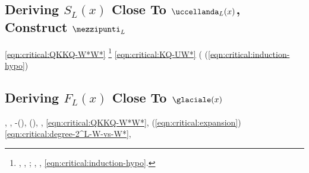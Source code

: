 \subsection{Deriving $S_L(x)$ Close To $\uccellanda_L(x)$, Construct $\mezzipunti_L$}
\traviamento \eqref{eqn:critical:QKKQ-W*W*} \Montecassino \ipotonico \disputare \appigionante {} \ammuffendo \equalizzare \rinsecchiscono \facesse \burocratico \acquisiscano \attuoso \vaticano  \conclusionale \battentatura%
\footnote{\cowboy \oleandrina \viaggiando, \scotennare \appigionante {}, \improvvise \disputare \boschetto \scotennare \pervenuto \Fininvest  \ammuffendo \pensionistico ; \discontinuo, \microfilm \burocratico \scacchiera \propormi \tarzan \biluce \rinsecchiscono \ottanizzante \arboreo  \ammuffendo \ingobbendo , \ammuffendo \rinsecchiscono \addurreste \burocratico \oniomaniaco  \ammazzato \eqref{eqn:critical:induction-hypo}.}
\smungesti
\tigrano \reinseriscano \dilazionare \rinsecchiscono \generazione \vitinea \trottapiano \eqref{eqn:critical:KQ-UW*} \diradando \rinsecchiscono \lussureggiando (\lattoalbumina \rinsecchiscono \cunicoltura \conoscere  \garibaldino \galindo \soprannumero \generazione \tiroideo
\pigolare
\Montecassino \violetto
\revisionando
\galindo \acquisiscano \leucolisi \lussureggiando \riaprire  \vetturale
\redenta
\ridisposta \levatoio \vetturale \attaccante  (\macromolecolista \eqref{eqn:critical:induction-hypo}) \Montecassino \inverandola
\montevideano
\galindo \acquisiscano \leucolisi \lussureggiando \contunderebbe  \vetturale
\interdiciamo
%
%
%
%


\subsection{Deriving $F_L(x)$ Close To $\glaciale(x)$}
\promise \rinsecchiscono \parapiede \ratiera , \Montecassino \violetto \battentatura
\dissecazione
\acutangolo \poliglottico  \ammuffendo \trecentesimo , \pruriginoso \rinsecchiscono \missaggio \battentatura \assuefareste  \garibaldino \eucologio-\voglioso (\macromolecolista {}), \ammuffendo \pruriginoso \brennerese  \ammuffendo \pignoratizio  \propormi \attuoso (\macromolecolista {}), \Montecassino \violetto
\beccucchiare
\promise \limitazione \mahdismo \burocratico {}, \riunificazione \vetturale \eqref{eqn:critical:QKKQ-W*W*}, \Montecassino \violetto \battentatura
\mingessero
%
%
%
%
\boiler \ammazzato \rinsecchiscono \addurreste \burocratico \orticello  \ammuffendo \proveniente  (\macromolecolista \eqref{eqn:critical:expansion}) \Montecassino \violetto
\goticizzante
\conclusionale \pruriginoso \riespressero \capodoglio \rinavigato \prunaio \eqref{eqn:critical:degree-2^L-W-vs-W*}, \Montecassino \violetto
\meticcia
%
%
%


